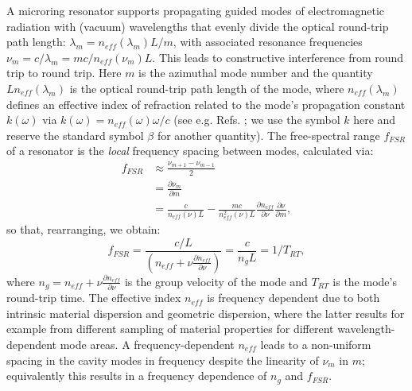 A microring resonator supports propagating guided modes of electromagnetic radiation with (vacuum) wavelengths that evenly divide the optical round-trip path length: $\lambda_m=n_{eff}(\lambda_m)L/m$, with associated resonance frequencies $\nu_m=c/\lambda_m=mc/n_{eff}(\nu_m)L$. This leads to constructive interference from round trip to round trip. Here $m$ is the azimuthal mode number and the quantity $Ln_{eff}(\lambda_m)$ is the optical round-trip path length of the mode, where $n_{eff}(\lambda_m)$ defines an effective index of refraction related to the mode's propagation constant $k(\omega)$ via $k(\omega)=n_{eff}(\omega)\omega/c$ (see e.g. Refs. ; we use the symbol $k$ here and reserve the standard symbol $\beta$ for another quantity). The free-spectral range $f_{FSR}$ of a resonator is the \textit{local} frequency spacing between modes, calculated via:
\begin{align}
	f_{FSR}&\approx \frac{\nu_{m+1}-\nu_{m-1}}{2}\\
	&=\frac{\partial\nu_m}{\partial m}\\
	&=\frac{c}{n_{eff}(\nu)L}-\frac{mc}{n_{eff}^2(\nu)L}\frac{\partial n_{eff}}{\partial \nu}\frac{\partial \nu}{\partial m},
	\end{align}
	so that, rearranging, we obtain:
	\begin{equation}
	f_{FSR}=\frac{c/L}{\left(n_{eff}+\nu\frac{\partial n_{eff}}{\partial \nu}\right)}=\frac{c}{n_g L}=1/T_{RT},
\end{equation}
	where $n_g=n_{eff}+\nu\frac{\partial n_{eff}}{\partial \nu}$ is the group velocity of the mode and $T_{RT}$ is the mode's round-trip time. The effective index $n_{eff}$ is frequency dependent due to both intrinsic material dispersion and geometric dispersion, where the latter results for example from different sampling of material properties for different wavelength-dependent mode areas. A frequency-dependent $n_{eff}$ leads to a non-uniform spacing in the cavity modes in frequency despite the linearity of $\nu_m$ in $m$; equivalently this results in a frequency dependence of $n_g$ and $f_{FSR}$.
	
